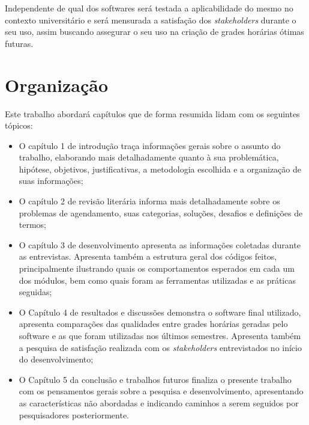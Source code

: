 Independente de qual dos softwares será testada a aplicabilidade do mesmo no contexto universitário e será mensurada a satisfação dos \textit{stakeholders} durante o seu uso, assim buscando assegurar o seu uso na criação de grades horárias ótimas futuras.

\section{Organização} %

Este trabalho abordará capítulos que de forma resumida lidam com os seguintes tópicos:

\begin{itemize}
  \item O capítulo 1 de introdução traça informações gerais sobre o assunto do trabalho, elaborando mais detalhadamente quanto à sua problemática, hipótese, objetivos, justificativas, a metodologia escolhida e a organização de suas informações;
  \item O capítulo 2 de revisão literária informa mais detalhadamente sobre os problemas de agendamento, suas categorias, soluções, desafios e definições de termos;
  \item O capítulo 3 de desenvolvimento apresenta as informações coletadas durante as entrevistas. Apresenta também a estrutura geral dos códigos feitos, principalmente ilustrando quais os comportamentos esperados em cada um dos módulos, bem como quais foram as ferramentas utilizadas e as práticas seguidas;
  \item O Capítulo 4 de resultados e discussões demonstra o software final utilizado, apresenta comparações das qualidades entre grades horárias geradas pelo software e as que foram utilizadas nos últimos semestres. Apresenta também a pesquisa de satisfação realizada com os \textit{stakeholders} entrevistados no início do desenvolvimento;
  \item O Capítulo 5 da conclusão e trabalhos futuros finaliza o presente trabalho com os pensamentos gerais sobre a pesquisa e desenvolvimento, apresentando as características não abordadas e indicando caminhos a serem seguidos por pesquisadores posteriormente.
\end{itemize}

